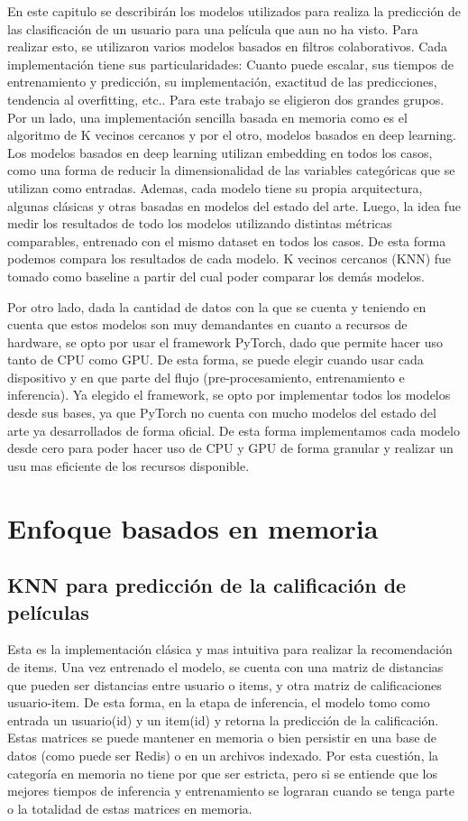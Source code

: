 \documentclass[11pt,a4paper,twoside]{thesis}
\begin{document}
En este capitulo se describirán los modelos utilizados para realiza la predicción de las clasificación de un usuario para una película
que aun no ha visto. Para realizar esto, se utilizaron varios modelos basados en filtros colaborativos. Cada implementación tiene sus particularidades: 
Cuanto puede escalar, sus tiempos de entrenamiento y predicción, su implementación, exactitud de las predicciones, tendencia al overfitting, etc..
Para este trabajo se eligieron dos grandes grupos. Por un lado, una implementación sencilla basada en memoria como es el algoritmo de K vecinos cercanos y 
por el otro, modelos basados en deep learning. Los modelos basados en deep learning utilizan embedding en todos los casos, como una forma de reducir la 
dimensionalidad de las variables categóricas que se utilizan como entradas. Ademas, cada modelo tiene su propia arquitectura, algunas clásicas y otras basadas 
en modelos del estado del arte. Luego, la idea fue medir los resultados de todo los modelos utilizando distintas métricas comparables, entrenado con el mismo
dataset en todos los casos. De esta forma podemos compara los resultados de cada modelo. K vecinos cercanos (KNN) fue tomado como baseline a partir del cual 
poder comparar los demás modelos.

Por otro lado, dada la cantidad de datos con la que se cuenta y teniendo en cuenta que estos modelos son muy 
demandantes en cuanto a recursos de hardware, se opto por usar el framework PyTorch, dado que permite hacer uso tanto de CPU como GPU. 
De esta forma, se puede elegir cuando usar cada dispositivo y en que parte del flujo (pre-procesamiento, entrenamiento 
e inferencia). Ya elegido el framework, se opto por implementar todos los modelos desde sus bases, ya que PyTorch no cuenta con mucho
modelos del estado del arte ya desarrollados de forma oficial. De esta forma implementamos cada modelo desde cero para poder hacer uso de CPU y GPU de forma granular
y realizar un usu mas eficiente de los recursos disponible.

\section{Enfoque basados en memoria}

\subsection{KNN para predicción de la calificación de películas}

Esta es la implementación clásica y mas intuitiva para realizar la recomendación de items. Una vez entrenado
el modelo, se cuenta con una matriz de distancias que pueden ser distancias entre usuario o items, y otra matriz de calificaciones usuario-item. 
De esta forma, en la etapa de inferencia, el  modelo tomo como entrada un usuario(id) y un item(id) y retorna la predicción de la calificación. 
Estas matrices se puede mantener en memoria o bien persistir en una base de datos (como puede ser Redis) o en un archivos indexado. 
Por esta cuestión, la categoría en memoria no tiene por que ser estricta, pero si se entiende que los mejores tiempos de inferencia y entrenamiento 
se lograran cuando se tenga parte o la totalidad de estas matrices en memoria. 
\end{document}
